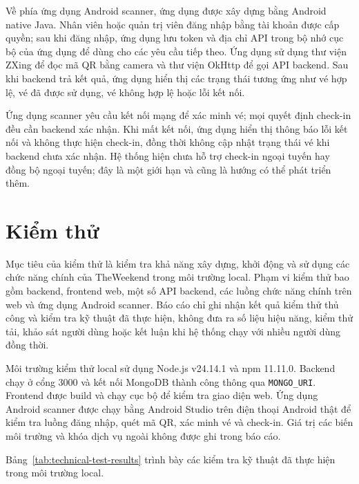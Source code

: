 ﻿\documentclass[../DoAn.tex]{subfiles}
\begin{document}
Về phía ứng dụng Android scanner, ứng dụng được xây dựng bằng Android native Java. Nhân viên hoặc quản trị viên đăng nhập bằng tài khoản được cấp quyền; sau khi đăng nhập, ứng dụng lưu token và địa chỉ API trong bộ nhớ cục bộ của ứng dụng để dùng cho các yêu cầu tiếp theo. Ứng dụng sử dụng thư viện ZXing để đọc mã QR bằng camera và thư viện OkHttp để gọi API backend. Sau khi backend trả kết quả, ứng dụng hiển thị các trạng thái tương ứng như vé hợp lệ, vé đã được sử dụng, vé không hợp lệ hoặc lỗi kết nối.

Ứng dụng scanner yêu cầu kết nối mạng để xác minh vé; mọi quyết định check-in đều cần backend xác nhận. Khi mất kết nối, ứng dụng hiển thị thông báo lỗi kết nối và không thực hiện check-in, đồng thời không cập nhật trạng thái vé khi backend chưa xác nhận. Hệ thống hiện chưa hỗ trợ check-in ngoại tuyến hay đồng bộ ngoại tuyến; đây là một giới hạn và cũng là hướng có thể phát triển thêm.

\section{Kiểm thử}
\label{sec:testing}

Mục tiêu của kiểm thử là kiểm tra khả năng xây dựng, khởi động và sử dụng các chức năng chính của TheWeekend trong môi trường local. Phạm vi kiểm thử bao gồm backend, frontend web, một số API backend, các luồng chức năng chính trên web và ứng dụng Android scanner. Báo cáo chỉ ghi nhận kết quả kiểm thử thủ công và kiểm tra kỹ thuật đã thực hiện, không đưa ra số liệu hiệu năng, kiểm thử tải, khảo sát người dùng hoặc kết luận khi hệ thống chạy với nhiều người dùng đồng thời.

Môi trường kiểm thử local sử dụng Node.js v24.14.1 và npm 11.11.0. Backend chạy ở cổng 3000 và kết nối MongoDB thành công thông qua \texttt{MONGO\_URI}. Frontend được build và chạy cục bộ để kiểm tra giao diện web. Ứng dụng Android scanner được chạy bằng Android Studio trên điện thoại Android thật để kiểm tra luồng đăng nhập, quét mã QR, xác minh vé và check-in. Giá trị các biến môi trường và khóa dịch vụ ngoài không được ghi trong báo cáo.

Bảng~\ref{tab:technical-test-results} trình bày các kiểm tra kỹ thuật đã thực hiện trong môi trường local.
\end{document}
